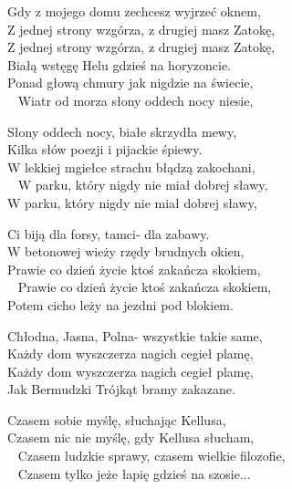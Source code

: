 \begin{text}
Gdy z mojego domu zechcesz wyjrzeć oknem,\\
Z jednej strony wzgórza, z drugiej masz Zatokę,\\
Z jednej strony wzgórza, z drugiej masz Zatokę,\\
Białą wstęgę Helu gdzieś na horyzoncie. \\
Ponad głową chmury jak nigdzie na świecie,\\ 
Wiatr od morza słony oddech nocy niesie, 

Słony oddech nocy, białe skrzydła mewy, \\
Kilka słów poezji i pijackie śpiewy. \\
W lekkiej mgiełce strachu błądzą zakochani,\\ 
W parku, który nigdy nie miał dobrej sławy, \\
W parku, który nigdy nie miał dobrej sławy,

Ci biją dla forsy, tamci- dla zabawy. \\
W betonowej wieży rzędy brudnych okien, \\
Prawie co dzień życie ktoś zakańcza skokiem,\\ 
Prawie co dzień życie ktoś zakańcza skokiem,\\
Potem cicho leży na jezdni pod blokiem. 

Chłodna, Jasna, Polna- wszystkie takie same,\\
Każdy dom wyszczerza nagich cegieł plamę,\\
Każdy dom wyszczerza nagich cegieł plamę,\\
Jak Bermudzki Trójkąt bramy zakazane. 

Czasem sobie myślę, słuchając Kellusa,\\
Czasem nic nie myślę, gdy Kellusa słucham,\\ 
Czasem ludzkie sprawy, czasem wielkie filozofie,\\ 
Czasem tylko jeże łapię gdzieś na szosie...
\end{text}